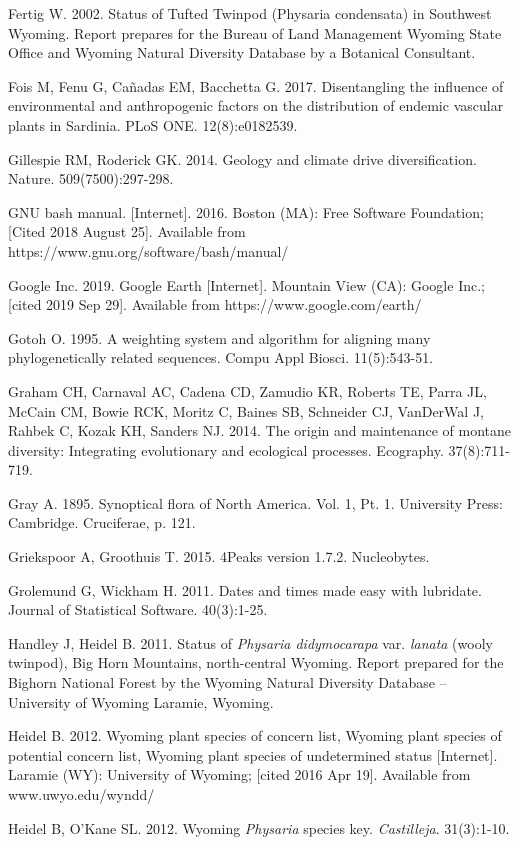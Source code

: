 Fertig W. 2002. Status of Tufted Twinpod (Physaria condensata) in Southwest Wyoming. Report prepares for the Bureau of Land Management Wyoming State Office and Wyoming Natural Diversity Database by a Botanical Consultant.

Fois M, Fenu G, Cañadas EM, Bacchetta G. 2017. Disentangling the influence of environmental and anthropogenic factors on the distribution of endemic vascular plants in Sardinia. PLoS ONE. 12(8):e0182539.

Gillespie RM, Roderick GK. 2014. Geology and climate drive diversification. Nature. 509(7500):297-298.

GNU bash manual. [Internet]. 2016. Boston (MA): Free Software Foundation; [Cited 2018 August 25]. Available from https://www.gnu.org/software/bash/manual/

Google Inc. 2019. Google Earth [Internet]. Mountain View (CA): Google Inc.; [cited 2019 Sep 29]. Available from https://www.google.com/earth/

Gotoh O. 1995. A weighting system and algorithm for aligning many phylogenetically related sequences. Compu Appl Biosci. 11(5):543-51.

Graham CH, Carnaval AC, Cadena CD, Zamudio KR, Roberts TE, Parra JL, McCain CM, Bowie RCK, Moritz C, Baines SB, Schneider CJ, VanDerWal J, Rahbek C, Kozak KH, Sanders NJ. 2014. The origin and maintenance of montane diversity: Integrating evolutionary and ecological processes. Ecography. 37(8):711-719.

Gray A. 1895. Synoptical flora of North America. Vol. 1, Pt. 1. University Press: Cambridge. Cruciferae, p. 121.

Griekspoor A, Groothuis T. 2015. 4Peaks version 1.7.2. Nucleobytes.

Grolemund G, Wickham H. 2011. Dates and times made easy with lubridate. Journal of Statistical Software. 40(3):1-25.

Handley J, Heidel B. 2011. Status of \textit{Physaria didymocarapa} var. \textit{lanata} (wooly twinpod), Big Horn Mountains, north-central Wyoming. Report prepared for the Bighorn National Forest by the Wyoming Natural Diversity Database – University of Wyoming Laramie, Wyoming.

Heidel B. 2012. Wyoming plant species of concern list, Wyoming plant species of potential concern list, Wyoming plant species of undetermined status  [Internet]. Laramie (WY): University of Wyoming; [cited 2016 Apr 19]. Available from www.uwyo.edu/wyndd/

Heidel B, O’Kane SL. 2012. Wyoming \textit{Physaria} species key. \textit{Castilleja}. 31(3):1-10.

